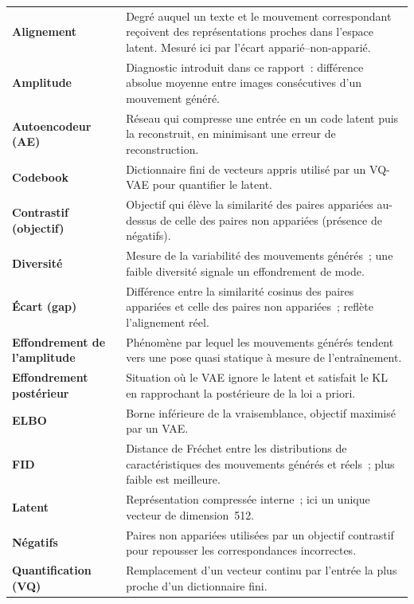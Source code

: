 \documentclass[12pt,a4paper,oneside]{report}
\theoremstyle{definition}
\theoremstyle{plain}
\renewcommand{\arraystretch}{1.15}
\begin{document}
\begingroup
\setlength{\tabcolsep}{8pt}
\renewcommand{\arraystretch}{1.3}
\noindent
\begin{longtable}{@{}p{3.6cm}p{11cm}@{}}
\textbf{Alignement} & Degré auquel un texte et le mouvement correspondant reçoivent
des représentations proches dans l'espace latent. Mesuré ici par l'écart
apparié--non-apparié. \\
\textbf{Amplitude} & Diagnostic introduit dans ce rapport~: différence absolue
moyenne entre images consécutives d'un mouvement généré. \\
\textbf{Autoencodeur (AE)} & Réseau qui compresse une entrée en un code latent puis
la reconstruit, en minimisant une erreur de reconstruction. \\
\textbf{Codebook} & Dictionnaire fini de vecteurs appris utilisé par un VQ-VAE pour
quantifier le latent. \\
\textbf{Contrastif (objectif)} & Objectif qui élève la similarité des paires
appariées au-dessus de celle des paires non appariées (présence de négatifs). \\
\textbf{Diversité} & Mesure de la variabilité des mouvements générés~; une faible
diversité signale un effondrement de mode. \\
\textbf{Écart (gap)} & Différence entre la similarité cosinus des paires appariées
et celle des paires non appariées~; reflète l'alignement réel. \\
\textbf{Effondrement de l'amplitude} & Phénomène par lequel les mouvements générés
tendent vers une pose quasi statique à mesure de l'entraînement. \\
\textbf{Effondrement postérieur} & Situation où le VAE ignore le latent et satisfait
le KL en rapprochant la postérieure de la loi a priori. \\
\textbf{ELBO} & Borne inférieure de la vraisemblance, objectif maximisé par un VAE. \\
\textbf{FID} & Distance de Fréchet entre les distributions de caractéristiques des
mouvements générés et réels~; plus faible est meilleure. \\
\textbf{Latent} & Représentation compressée interne~; ici un unique vecteur de
dimension~512. \\
\textbf{Négatifs} & Paires non appariées utilisées par un objectif contrastif pour
repousser les correspondances incorrectes. \\
\textbf{Quantification (VQ)} & Remplacement d'un vecteur continu par l'entrée la
plus proche d'un dictionnaire fini. \\

\end{longtable}
\end{document}
